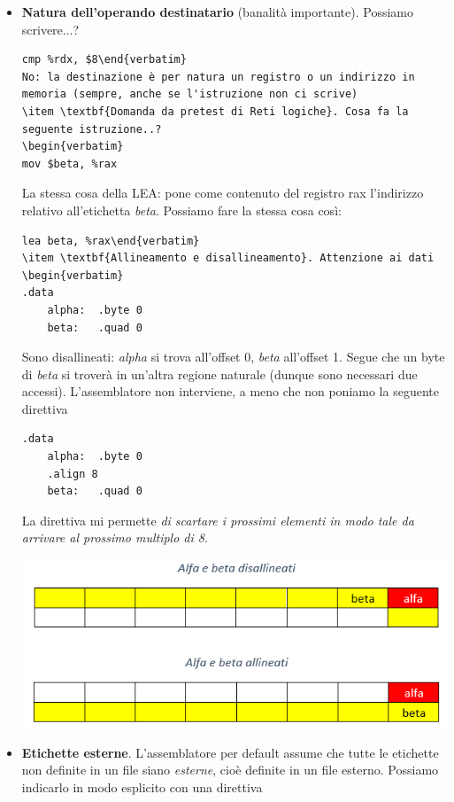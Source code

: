 \documentclass[11pt]{report}
\theoremstyle{definition}
\begin{document}
\begin{itemize}
\item \textbf{Natura dell'operando destinatario} (banalità importante). Possiamo scrivere...? \begin{verbatim}cmp %rdx, $8\end{verbatim} 
No: la destinazione è per natura un registro o un indirizzo in memoria (sempre, anche se l'istruzione non ci scrive) 
\item \textbf{Domanda da pretest di Reti logiche}. Cosa fa la seguente istruzione..?
\begin{verbatim}
mov $beta, %rax
\end{verbatim}
La stessa cosa della LEA: pone come contenuto del registro rax l'indirizzo relativo all'etichetta \emph{beta}. Possiamo fare la stessa cosa così:
\begin{verbatim}lea beta, %rax\end{verbatim}
\item \textbf{Allineamento e disallineamento}. Attenzione ai dati
\begin{verbatim}
.data
    alpha:  .byte 0
    beta:   .quad 0
\end{verbatim}
Sono disallineati: \emph{alpha} si trova all'offset 0, \emph{beta} all'offset 1. Segue che un byte di \emph{beta} si troverà in un'altra regione naturale (dunque sono necessari due accessi). L'assemblatore non interviene, a meno che non poniamo la seguente direttiva
\begin{verbatim}
.data
    alpha:  .byte 0
    .align 8
    beta:   .quad 0
\end{verbatim}
La direttiva mi permette \emph{di scartare i prossimi elementi in modo tale da arrivare al prossimo multiplo di 8}.
\begin{center}
	\includegraphics[scale=.85]{img/149.PNG}
\end{center} 
\item \textbf{Etichette esterne}. L'assemblatore per default assume che tutte le etichette non definite in un file siano \emph{esterne}, cioè definite in un file esterno. Possiamo indicarlo in modo esplicito con una direttiva

\end{itemize}
\end{document}
